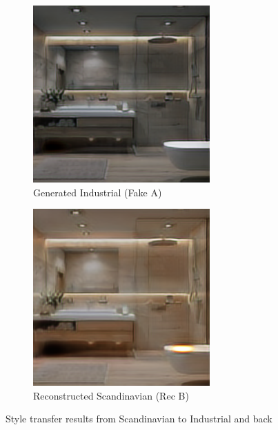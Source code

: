 \documentclass[twocolumn,superscriptaddress,aps]{revtex4-1}
\begin{document}
\begin{figure}[h]
\centering
\begin{subfigure}{0.2\textwidth}
    \includegraphics[width=\textwidth]{assets/fake_A.png}
    \caption{Generated Industrial (Fake A)}
    \label{fig:fake_industrial}
\end{subfigure}
\hfill
\begin{subfigure}{0.2\textwidth}
    \includegraphics[width=\textwidth]{assets/rec_B.png}
    \caption{Reconstructed Scandinavian (Rec B)}
    \label{fig:reconstructed_scandinavian}
\end{subfigure}
\caption{Style transfer results from Scandinavian to Industrial and back}
\label{fig:scandinavian_to_industrial_results}
\end{figure}
\end{document}
